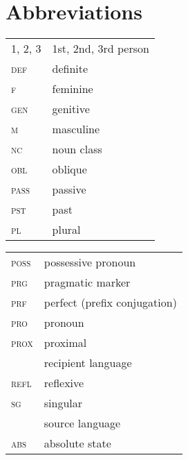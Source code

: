 \documentclass[output=paper]{langsci/langscibook}
\begin{document}
\section*{Abbreviations}

\begin{tabularx}{.5\textwidth}[t]{@{}lQ@{}}
\textsc{1, 2, 3} & 1st, 2nd, 3rd person \\
\textsc{def} & {definite}  \\
\textsc{f} & feminine \\
\textsc{gen} & genitive \\
\textsc{m} & masculine \\
\textsc{nc} & noun class  \\
\textsc{obl} & oblique \\
\textsc{pass} & {passive} \\
\textsc{pst} & past \\
\textsc{pl} & plural \\
\end{tabularx}%
\begin{tabularx}{.5\textwidth}[t]{@{}lQ@{}}
\textsc{poss} & possessive pronoun \\
\textsc{prg} & pragmatic marker \\
\textsc{prf} & perfect (prefix conjugation) \\
\textsc{pro} & pronoun \\
\textsc{prox} & proximal \\
 & {recipient language} \\
\textsc{refl} & reflexive \\
\textsc{sg} & singular \\
 & {source language} \\
\textsc{abs} & absolute state \\
\end{tabularx}%

{\sloppy\printbibliography[heading=subbibliography,notkeyword=this]}
\end{document}
